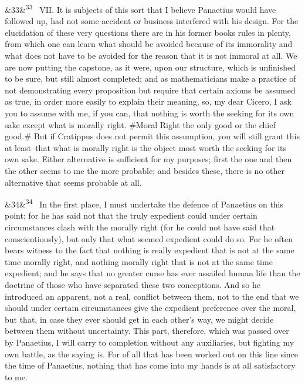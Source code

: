 \documentclass[12pt]{article}
\newcommand{\para}[1][]{\par\noindent\ifx&#1&\else\textsuperscript{\footnotesize #1}~\fi}
\begin{document}
\para[33] VII. It is subjects of this sort that I believe Panaetius would have followed up, had not some accident or business interfered with his design. For the elucidation of these very questions there are in his former books rules in plenty, from which one can learn what should be avoided because of its immorality and what does not have to be avoided for the reason that it is not immoral at all. We are now putting the capstone, as it were, upon our structure, which is unfinished to be sure, but still almost completed; and as mathematicians make a practice of not demonstrating every proposition but require that certain axioms be assumed as true, in order more easily to explain their meaning, so, my dear Cicero, I ask you to assume with me, if you can, that nothing is worth the seeking for its own sake except what is morally right. \#Moral Right the only good or the chief good.\# But if Cratippus does not permit this assumption, you will still grant this at least--that what is morally right is the object most worth the seeking for its own sake. Either alternative is sufficient for my purposes; first the one and then the other seems to me the more probable; and besides these, there is no other alternative that seems probable at all.

\para[34] In the first place, I must undertake the defence of Panaetius on this point; for he has said not that the truly expedient could under certain circumstances clash with the morally right (for he could not have said that conscientiously), but only that what seemed expedient could do so. For he often bears witness to the fact that nothing is really expedient that is not at the same time morally right, and nothing morally right that is not at the same time expedient; and he says that no greater curse has ever assailed human life than the doctrine of those who have separated these two conceptions. And so he introduced an apparent, not a real, conflict between them, not to the end that we should under certain circumstances give the expedient preference over the moral, but that, in case they ever should get in each other's way, we might decide between them without uncertainty. This part, therefore, which was passed over by Panaetius, I will carry to completion without any auxiliaries, but fighting my own battle, as the saying is. For of all that has been worked out on this line since the time of Panaetius, nothing that has come into my hands is at all satisfactory to me.
\end{document}
